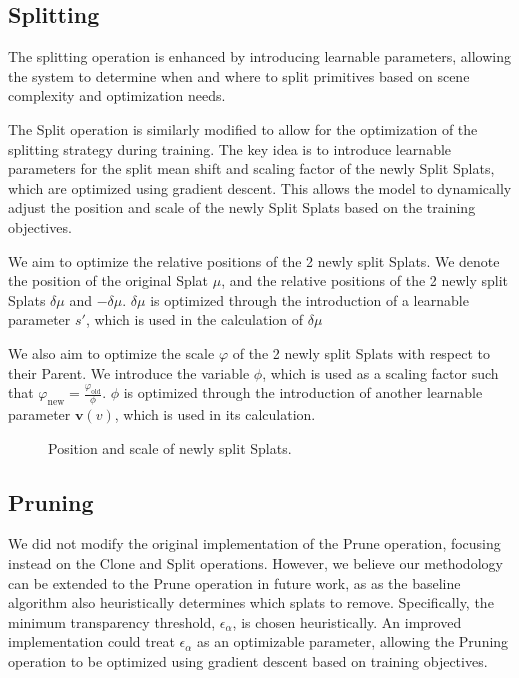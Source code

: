 \documentclass[11pt]{report}
\begin{document}
\subsection{Splitting}
The splitting operation is enhanced by introducing learnable parameters, allowing the system to determine when and where to split primitives based on scene complexity and optimization needs. 



The Split operation is similarly modified to allow for the optimization of the splitting strategy during training. The key idea is to introduce learnable parameters for the split mean shift and scaling factor of the newly Split Splats, which are optimized using gradient descent. This allows the model to dynamically adjust the position and scale of the newly Split Splats based on the training objectives. 

We aim to optimize the relative positions of the 2 newly split Splats. We denote the position of the original Splat $\mu$, and the relative positions of the 2 newly split Splats $\delta \mu$ and $- \delta \mu$. $\delta \mu$ is optimized through the introduction of a learnable parameter $s'$, which is used in the calculation of $\delta \mu$

We also aim to optimize the scale $\varphi$ of the 2 newly split Splats with respect to their Parent. We introduce the variable $\phi$, which is used as a scaling factor such that $\varphi_{\text{new}} = \frac{\varphi_{\text{old}}}{\phi}$. $\phi$ is optimized through the introduction of another learnable parameter $\mathbf{v}(v)$, which is used in its calculation.

\begin{figure}[H]
    \centering
    
    \caption{Position and scale of newly split Splats.}
    \label{fig:split}
\end{figure}

\subsection{Pruning}
\label{subsec:improved_pruning}

We did not modify the original implementation of the Prune operation, focusing instead on the Clone and Split operations. However, we believe our methodology can be extended to the Prune operation in future work, as as the baseline algorithm also heuristically determines which splats to remove. Specifically, the minimum transparency threshold, $\epsilon_{\alpha}$, is chosen heuristically. An improved implementation could treat $\epsilon_{\alpha}$ as an optimizable parameter, allowing the Pruning operation to be optimized using gradient descent based on training objectives.
\end{document}

